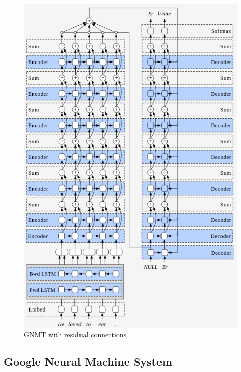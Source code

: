 \documentclass[a4paper]{article}
\begin{document}
\begin{figure}
  \centering
  \includegraphics[width=.9\linewidth]{img/residual_gnmt.png}
  \caption{GNMT with residual connections}
  \label{fig:gnmtres}
\end{figure}


\subsection{Google Neural Machine System}
\end{document}
